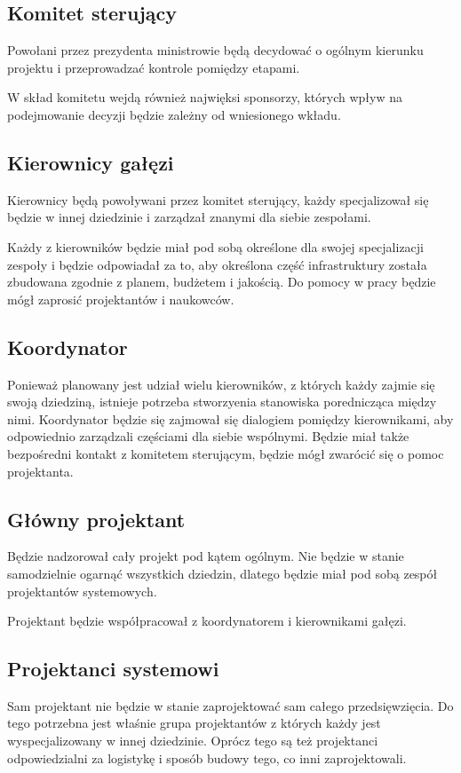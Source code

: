 \subsection{Komitet sterujący}
Powołani przez prezydenta ministrowie będą decydować o ogólnym kierunku projektu i przeprowadzać kontrole pomiędzy etapami.

W skład komitetu wejdą również najwięksi sponsorzy, których wpływ na podejmowanie decyzji będzie zależny od wniesionego wkładu.

\subsection{Kierownicy gałęzi}
Kierownicy będą powoływani przez komitet sterujący, każdy specjalizował się będzie w innej dziedzinie i zarządzał znanymi dla siebie zespołami.

Każdy z kierowników będzie miał pod sobą określone dla swojej specjalizacji zespoły i będzie odpowiadał za to, aby określona część infrastruktury została zbudowana zgodnie z planem, budżetem i jakością.
Do pomocy w pracy będzie mógł zaprosić projektantów i naukowców.

\subsection{Koordynator}
Ponieważ planowany jest udział wielu kierowników, z których każdy zajmie się swoją dziedziną, istnieje potrzeba stworzyenia stanowiska porednicząca między nimi.
Koordynator będzie się zajmował się dialogiem pomiędzy kierownikami, aby odpowiednio zarządzali częściami dla siebie wspólnymi.
Będzie miał także bezpośredni kontakt z komitetem sterującym, będzie mógł zwarócić się o pomoc projektanta.

\subsection{Główny projektant}
Będzie nadzorował cały projekt pod kątem ogólnym. 
Nie będzie w stanie samodzielnie ogarnąć wszystkich dziedzin, dlatego będzie miał pod sobą zespół projektantów systemowych.

Projektant będzie współpracował z koordynatorem i kierownikami gałęzi.

\subsection{Projektanci systemowi}
Sam projektant nie będzie w stanie zaprojektować sam całego przedsięwzięcia.
Do tego potrzebna jest właśnie grupa projektantów z których każdy jest wyspecjalizowany w innej dziedzinie.
Oprócz tego są też projektanci odpowiedzialni za logistykę i sposób budowy tego, co inni zaprojektowali.

